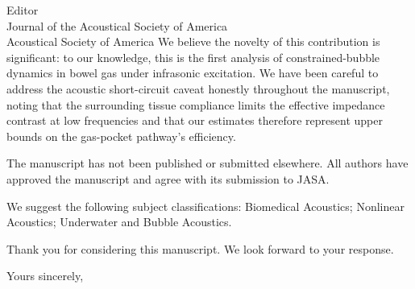 \documentclass[12pt]{letter}
\begin{document}
\begin{letter}{%
  Editor\\
  Journal of the Acoustical Society of America\\
  Acoustical Society of America%
}
We believe the novelty of this contribution is significant: to our knowledge,
this is the first analysis of constrained-bubble dynamics in bowel gas under
infrasonic excitation.  We have been careful to address the acoustic
short-circuit caveat honestly throughout the manuscript, noting that the
surrounding tissue compliance limits the effective impedance contrast at low
frequencies and that our estimates therefore represent upper bounds on the
gas-pocket pathway's efficiency.

The manuscript has not been published or submitted elsewhere.  All authors
have approved the manuscript and agree with its submission to JASA.

We suggest the following subject classifications: Biomedical Acoustics;
Nonlinear Acoustics; Underwater and Bubble Acoustics.

Thank you for considering this manuscript.  We look forward to your response.

\closing{Yours sincerely,}

\end{letter}
\end{document}
